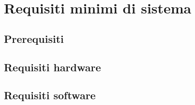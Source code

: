 \section{Requisiti minimi di sistema}

\subsection{Prerequisiti}

\subsection{Requisiti hardware}

\subsection{Requisiti software}